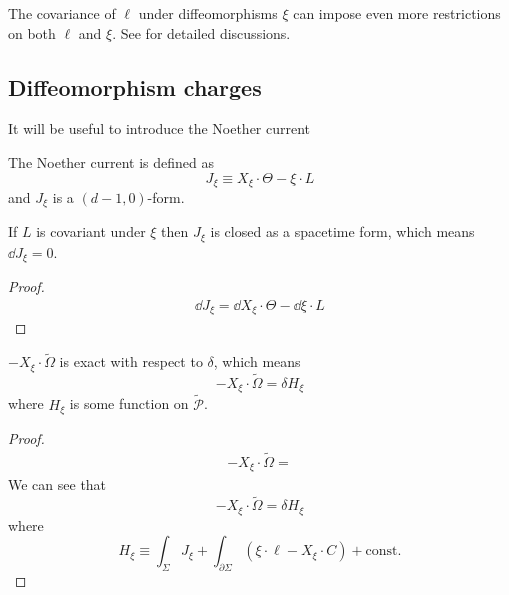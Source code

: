 \documentclass[10pt]{article}
\begin{document}
\begin{remark}
    The covariance of $\ell$ under diffeomorphisms $\xi$ can impose even more restrictions on both $\ell$ and $\xi$.
    See \cite{Harlow:2019yfa} for detailed discussions.
\end{remark}

\subsection{Diffeomorphism charges}

It will be useful to introduce the Noether current\cite{Iyer:1994ys}
\begin{definition}
    The Noether current is defined as
    \begin{equation}
        J_\xi\equiv X_\xi\cdot\Theta-\xi\cdot L
    \end{equation}
    and $J_\xi$ is a $(d-1,0)$-form.
\end{definition}

\begin{claim}
    If $L$ is covariant under $\xi$ then $J_{\xi}$ is closed as a spacetime form, which means $\dd{J_\xi}=0$.
\end{claim}
\begin{proof}
    \begin{equation}
        \begin{split}
            \dd{J_\xi}=\dd{X_\xi\cdot\Theta}-\dd{\xi\cdot L}
        \end{split}
    \end{equation}
\end{proof}


\begin{claim}
    $-X_\xi\cdot\tilde{\Omega}$ is exact with respect to $\delta$, which means
    \begin{equation}
        -X_\xi\cdot\tilde{\Omega}=\delta H_{\xi}
    \end{equation}
    where $H_{\xi}$ is some function on $\tilde{\mathcal{P}}$.
\end{claim}
\begin{proof}
    \begin{equation}
        \begin{split}
            -X_\xi\cdot\tilde{\Omega}=
        \end{split}
    \end{equation}
    We can see that
    \begin{equation}
        -X_\xi\cdot\tilde{\Omega}=\delta H_\xi
    \end{equation}
    where
    \begin{equation}
        H_\xi\equiv\int_{\Sigma}J_{\xi}+\int_{\partial\Sigma}(\xi\cdot\ell-X_\xi\cdot C)+\text{const.}
    \end{equation}

\end{proof}
\end{document}
